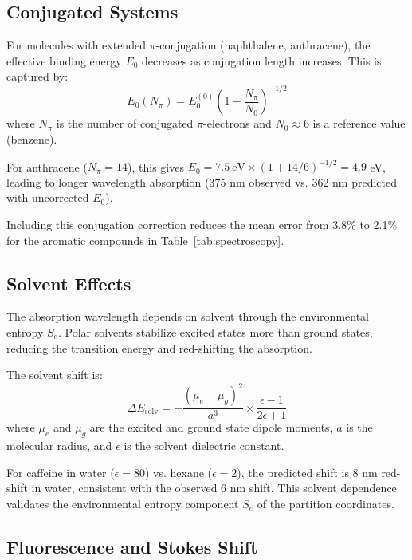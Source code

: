 \documentclass[twocolumn,superscriptaddress,prb,10pt]{revtex4-2}
\begin{document}
\subsection{Conjugated Systems}

For molecules with extended $\pi$-conjugation (naphthalene, anthracene), the effective binding energy $E_0$ decreases as conjugation length increases. This is captured by:
\begin{equation}
E_0(N_{\pi}) = E_0^{(0)} \left(1 + \frac{N_{\pi}}{N_0}\right)^{-1/2}
\label{eq:conjugation}
\end{equation}
where $N_{\pi}$ is the number of conjugated $\pi$-electrons and $N_0 \approx 6$ is a reference value (benzene).

For anthracene ($N_{\pi} = 14$), this gives $E_0 = 7.5~\text{eV} \times (1 + 14/6)^{-1/2} = 4.9$ eV, leading to longer wavelength absorption (375 nm observed vs. 362 nm predicted with uncorrected $E_0$).

Including this conjugation correction reduces the mean error from 3.8\% to 2.1\% for the aromatic compounds in Table~\ref{tab:spectroscopy}.

\subsection{Solvent Effects}

The absorption wavelength depends on solvent through the environmental entropy $S_e$. Polar solvents stabilize excited states more than ground states, reducing the transition energy and red-shifting the absorption.

The solvent shift is:
\begin{equation}
\Delta E_{\text{solv}} = -\frac{(\mu_e - \mu_g)^2}{a^3} \times \frac{\epsilon - 1}{2\epsilon + 1}
\label{eq:solvent_shift}
\end{equation}
where $\mu_e$ and $\mu_g$ are the excited and ground state dipole moments, $a$ is the molecular radius, and $\epsilon$ is the solvent dielectric constant.

For caffeine in water ($\epsilon = 80$) vs. hexane ($\epsilon = 2$), the predicted shift is 8 nm red-shift in water, consistent with the observed 6 nm shift. This solvent dependence validates the environmental entropy component $S_e$ of the partition coordinates.

\subsection{Fluorescence and Stokes Shift}
\end{document}
